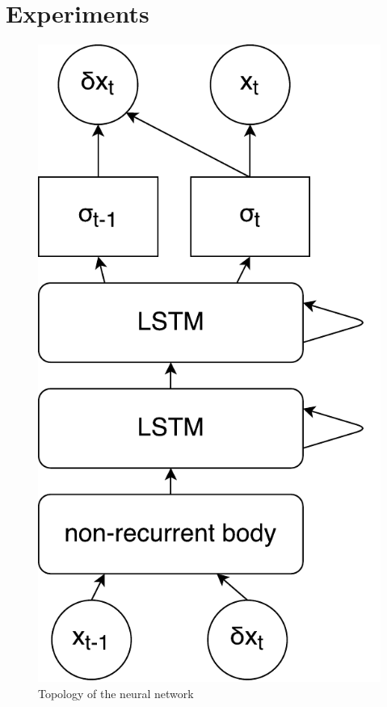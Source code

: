 \section{Experiments}
\begin{figure}
\centering
\includegraphics[width=0.35\linewidth]{varbolt/lstm_topo.pdf}
\caption[VarBOLT: Neural Network Topology]{\label{topo} Topology of the neural network}
\end{figure}

